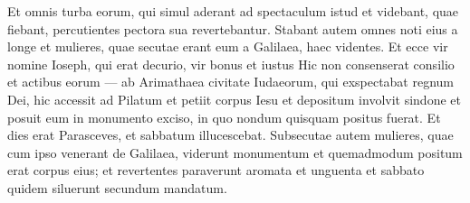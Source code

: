 \begin{biblechapter}
\begin{biblechapter}
\begin{biblechapter}
\begin{biblechapter}
\begin{biblechapter}
\begin{biblechapter}
\begin{biblechapter}
\begin{biblechapter}
\begin{biblechapter}
\begin{biblechapter}
\begin{biblechapter}
\begin{biblechapter}
\begin{biblechapter}
\begin{biblechapter}
\begin{biblechapter}
\begin{biblechapter}
\begin{biblechapter}
\begin{biblechapter}
\begin{biblechapter}
\begin{biblechapter}
\begin{biblechapter}
\begin{biblechapter}
\begin{biblechapter}
\verse Et omnis turba eorum, qui simul aderant ad spectaculum istud et videbant, quae fiebant, percutientes pectora sua revertebantur.
 \verse Stabant autem omnes noti eius a longe et mulieres, quae secutae erant eum a Galilaea, haec videntes.
 \verse Et ecce vir nomine Ioseph, qui erat decurio, vir bonus et iustus 
\verse Hic non consenserat consilio et actibus eorum — ab Arimathaea civitate Iudaeorum, qui exspectabat regnum Dei, 
\verse hic accessit ad Pilatum et petiit corpus Iesu 
 \verse et depositum involvit sindone et posuit eum in monumento exciso, in quo nondum quisquam positus fuerat. 
\verse Et dies erat Parasceves, et sabbatum illucescebat. 
\verse Subsecutae autem mulieres, quae cum ipso venerant de Galilaea, viderunt monumentum et quemadmodum positum erat corpus eius; 
\verse et revertentes paraverunt aromata et unguenta et sabbato quidem siluerunt secundum mandatum.
 

\end{biblechapter}
\end{biblechapter}
\end{biblechapter}
\end{biblechapter}
\end{biblechapter}
\end{biblechapter}
\end{biblechapter}
\end{biblechapter}
\end{biblechapter}
\end{biblechapter}
\end{biblechapter}
\end{biblechapter}
\end{biblechapter}
\end{biblechapter}
\end{biblechapter}
\end{biblechapter}
\end{biblechapter}
\end{biblechapter}
\end{biblechapter}
\end{biblechapter}
\end{biblechapter}
\end{biblechapter}
\end{biblechapter}
